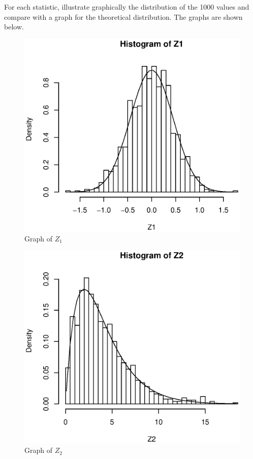 \documentclass[a4paper,11pt,fleqn]{article}
\begin{document}
\vskip 0.5cm

For each statistic, illustrate graphically the distribution of the 1000 values and compare with a graph for the theoretical distribution. The graphs are shown below.
\vskip 0.5cm
\begin{figure}[h!]
\centering
\includegraphics[scale=0.8]{Z1.eps}
\caption{Graph of $Z_1$}
\label{fig: $Z_1$}
\end{figure}
\vskip 0.5cm

\begin{figure}[h!]
\centering
\includegraphics[scale=0.8]{Z2.eps}
\caption{Graph of $Z_2$}
\label{fig: $Z_2$}
\end{figure}
\vskip 0.5cm
\end{document}
